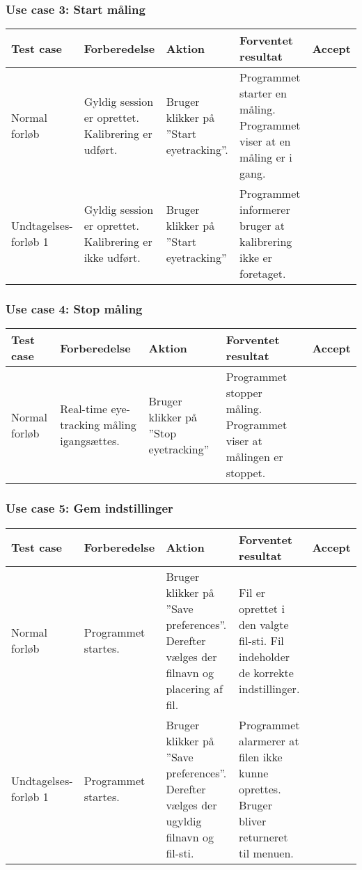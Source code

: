 \documentclass[accepttest.tex]{subfiles}
\begin{document}
\subsubsection{Use case 3: Start måling}
\begin{table}[H]
	\small
	\begin{tabular}{|p{2cm}|p{3cm}|p{3cm}|p{3cm}|l|}
		\hline Test case & Forberedelse & Aktion & Forventet resultat & Accept \\ 
		\hline Normal forløb & Gyldig session er oprettet. Kalibrering er udført.  & Bruger klikker på ”Start eyetracking”.   & Programmet starter en måling. Programmet viser at en måling er i gang. & {\Huge\checkmark}\\
		
		\hline Undtagelses-forløb 1 & Gyldig session er oprettet. Kalibrering er ikke udført. & Bruger klikker på ”Start eyetracking” & Programmet informerer bruger at kalibrering ikke er foretaget.  & {\Huge\checkmark}\\
		\hline 
	\end{tabular}
\end{table}

\subsubsection{Use case 4: Stop måling}
\begin{table}[H]
	\small
	\begin{tabular}{|p{2cm}|p{3cm}|p{3cm}|p{3cm}|l|}
		\hline Test case & Forberedelse & Aktion & Forventet resultat & Accept \\ 
		\hline Normal forløb & Real-time eye-tracking måling igangsættes. & Bruger klikker på ”Stop eyetracking” & Programmet stopper måling. Programmet viser at målingen er stoppet.  & {\Huge\checkmark}\\
		\hline 
	\end{tabular}
\end{table}

\subsubsection{Use case 5: Gem indstillinger}
\begin{table}[H]
	\small
	\begin{tabular}{|p{2cm}|p{3cm}|p{3cm}|p{3cm}|l|}
		\hline Test case & Forberedelse & Aktion & Forventet resultat & Accept \\ 
		\hline Normal forløb & Programmet startes. & Bruger klikker på ”Save preferences”. Derefter vælges der filnavn og placering af fil. & Fil er oprettet i den valgte fil-sti. Fil indeholder de korrekte indstillinger. & {\Huge\checkmark}\\
		
		\hline Undtagelses-forløb 1 & Programmet startes. & Bruger klikker på ”Save preferences”. Derefter vælges der ugyldig filnavn og fil-sti. & Programmet alarmerer at filen ikke kunne oprettes. Bruger bliver returneret til menuen. & {\Huge\checkmark}\\
		\hline 
	\end{tabular}
\end{table}
\end{document}
